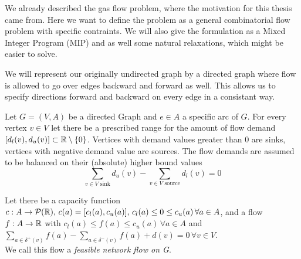 We already described the gas flow problem, where the motivation for this thesis came from. Here we want to define the 
problem as a general combinatorial flow problem with specific contraints. We will also give the formulation as a Mixed 
Integer Program (MIP) and as well some natural relaxations, which might be easier to solve.

We will represent our originally undirected graph by a directed graph where flow is allowed to go over edges backward 
and forward as well. This allows us to specify directions forward and backward on every edge in a consistant way. 


\begin{definition}
 Let $G=(V,A)$ be a directed Graph and $e \in A$ a specific arc of $G$. For every vertex $v\in V$ let there be a 
prescribed range for the amount of flow demand $[d_l(v), d_u(v)]\subset \mathbb{R} \setminus \{0\}$. Vertices with demand 
values greater than 0 are sinks, vertices with negative demand value are sources. The flow demands are assumed to be 
balanced on their (absolute) higher bound values 
$$\sum_{v \in V\textrm{ sink}}d_u(v)-\sum_{v \in V\textrm{ source}}d_l(v)=0$$ 

Let there be a capacity function $c:A\to \mathcal{P}(\mathbb{R}), \, c(a)=[c_l(a), c_u(a)],\, c_l(a)\le 0 \le c_u(a) \, \forall 
a\in A$, and a flow  $f: A\to \mathbb{R} $ with $c_l(a)\le f(a)\le 
c_u(a)\, \forall a\in A$ and $\sum_{a\in \delta^+(v)}f(a)-\sum_{a\in\delta^-(v)}f(a)+d(v) = 0 \, \forall v\in V$.\\
We call this flow a \textit{feasible network flow on G}.
\end{definition}

